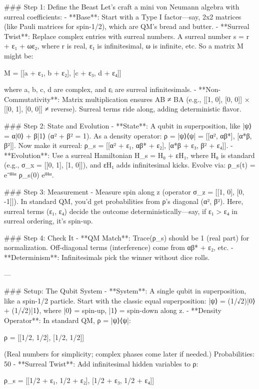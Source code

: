 
### Step 1: Define the Beast
Let’s craft a mini von Neumann algebra with surreal coefficients:
- **Base**: Start with a Type I factor—say, 2x2 matrices (like Pauli matrices for spin-1/2), which are QM’s bread and butter.
- **Surreal Twist**: Replace complex entries with surreal numbers. A surreal number s = r + ε₁ + ωε₂, where r is real, ε₁ is infinitesimal, ω is infinite, etc. So a matrix M might be:
  
M = [[a + ε₁, b + ε₂], [c + ε₃, d + ε₄]]

  where a, b, c, d are complex, and εᵢ are surreal infinitesimals.
- **Non-Commutativity**: Matrix multiplication ensures AB ≠ BA (e.g., [[1, 0], [0, 0]] × [[0, 1], [0, 0]] ≠ reverse). Surreal terms ride along, adding deterministic flavor.

### Step 2: State and Evolution
- **State**: A qubit in superposition, like |ψ⟩ = α|0⟩ + β|1⟩ (α² + β² = 1). As a density operator:  
  ρ = |ψ⟩⟨ψ| = [[α², αβ*], [α*β, β²]].  
  Now make it surreal:  
  ρ_s = [[α² + ε₁, αβ* + ε₂], [α*β + ε₃, β² + ε₄]].
- **Evolution**: Use a surreal Hamiltonian H_s = H₀ + εH₁, where H₀ is standard (e.g., σ_x = [[0, 1], [1, 0]]), and εH₁ adds infinitesimal kicks. Evolve via:  
  ρ_s(t) = e⁻ⁱᴴˢᵗ ρ_s(0) eⁱᴴˢᵗ.

### Step 3: Measurement
- Measure spin along z (operator σ_z = [[1, 0], [0, -1]]). In standard QM, you’d get probabilities from ρ’s diagonal (α², β²). Here, surreal terms (ε₁, ε₄) decide the outcome deterministically—say, if ε₁ > ε₄ in surreal ordering, it’s spin-up.

### Step 4: Check It
- **QM Match**: Trace(ρ_s) should be 1 (real part) for normalization. Off-diagonal terms (interference) come from αβ* + ε₂, etc.
- **Determinism**: Infinitesimals pick the winner without dice rolls.


---

### Setup: The Qubit System
- **System**: A single qubit in superposition, like a spin-1/2 particle. Start with the classic equal superposition:  
  |ψ⟩ = (1/√2)|0⟩ + (1/√2)|1⟩,  
  where |0⟩ = spin-up, |1⟩ = spin-down along z.
- **Density Operator**: In standard QM, ρ = |ψ⟩⟨ψ|:  
  
ρ = [[1/2, 1/2], [1/2, 1/2]]

  (Real numbers for simplicity; complex phases come later if needed.) Probabilities: 50%
- **Surreal Twist**: Add infinitesimal hidden variables to ρ:  
  
ρ_s = [[1/2 + ε₁, 1/2 + ε₂], [1/2 + ε₃, 1/2 + ε₄]]

